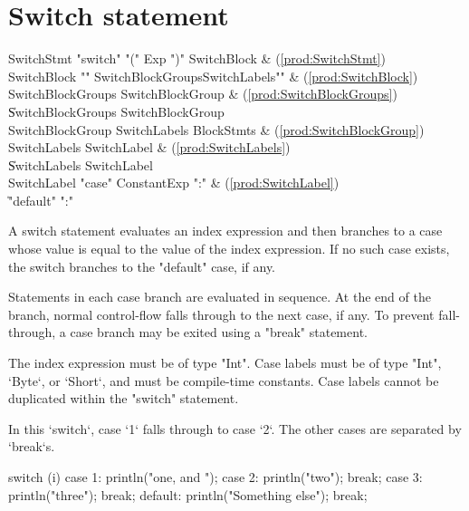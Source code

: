 \section{Switch statement}

\begin{bbgrammar}
          SwitchStmt \: \xcd"switch" \xcd"(" Exp \xcd")" SwitchBlock & (\ref{prod:SwitchStmt}) \\
         SwitchBlock \: \xcd"{" SwitchBlockGroups\opt SwitchLabels\opt \xcd"}" & (\ref{prod:SwitchBlock}) \\
   SwitchBlockGroups \: SwitchBlockGroup & (\ref{prod:SwitchBlockGroups}) \\
                     \| SwitchBlockGroups SwitchBlockGroup \\
    SwitchBlockGroup \: SwitchLabels BlockStmts & (\ref{prod:SwitchBlockGroup}) \\
        SwitchLabels \: SwitchLabel & (\ref{prod:SwitchLabels}) \\
                     \| SwitchLabels SwitchLabel \\
         SwitchLabel \: \xcd"case" ConstantExp \xcd":" & (\ref{prod:SwitchLabel}) \\
                     \| \xcd"default" \xcd":" \\
\end{bbgrammar}

A switch statement evaluates an index expression and then branches to
a case whose value is equal to the value of the index expression.
If no such case exists, the switch branches to the 
\xcd"default" case, if any.

Statements in each case branch are evaluated in sequence.  At the
end of the branch, normal control-flow falls through to the next case, if
any.  To prevent fall-through, a case branch may be exited using
a \xcd"break" statement.

The index expression must be of type \xcd"Int".
Case labels must be of type \xcd"Int", \xcd`Byte`, or \xcd`Short`, 
and must be compile-time 
constants.  Case labels cannot be duplicated within the
\xcd"switch" statement.

\begin{ex}
In this \xcd`switch`, case \xcd`1` falls through to case \xcd`2`.  The
other cases are separated by \xcd`break`s.
\begin{xten}
switch (i) {
  case 1: println("one, and ");
  case 2: println("two"); 
          break;
  case 3: println("three");
          break;
  default: println("Something else");
           break;
}
\end{xten}
\end{ex}

